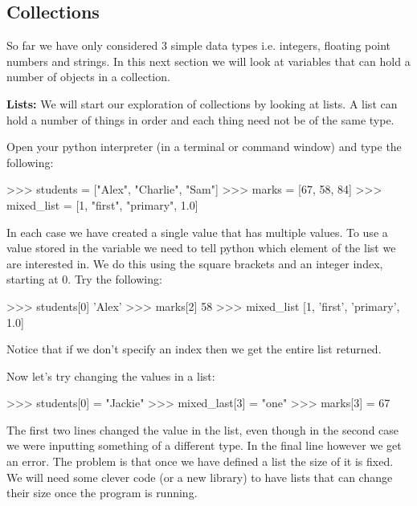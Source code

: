 \begin{minipage}{\textwidth}

\end{minipage}

\subsection{Collections}

So far we have only considered 3 simple data types i.e. integers, floating point numbers and strings. In this next section we will look at variables that can hold a number of objects in a collection.

\textbf{Lists:} We will start our exploration of collections by looking at lists. A list can hold a number of things in order and each thing need not be of the same type. 

Open your python interpreter (in a terminal or command window) and type the following:

\begin{python}
>>> students = ["Alex", "Charlie", "Sam"]
>>> marks = [67, 58, 84]
>>> mixed_list = [1, "first", "primary", 1.0]
\end{python}

In each case we have created a single value that has multiple values. To use a value stored in the variable we need to tell python which element of the list we are interested in. We do this using the square brackets and an integer index, starting at 0. Try the following:

\begin{python}
>>> students[0]
'Alex'
>>> marks[2]
58
>>> mixed_list
[1, 'first', 'primary', 1.0]
\end{python}

Notice that if we don't specify an index then we get the entire list returned.

Now let's try changing the values in a list:
\begin{python}
>>> students[0] = "Jackie"
>>> mixed_last[3] = "one"
>>> marks[3] = 67
\end{python}

The first two lines changed the value in the list, even though in the second case we were inputting something of a different type. In the final line however we get an error. The problem is that once we have defined a list the size of it is fixed. We will need some clever code (or a new library) to have lists that can change their size once the program is running.

